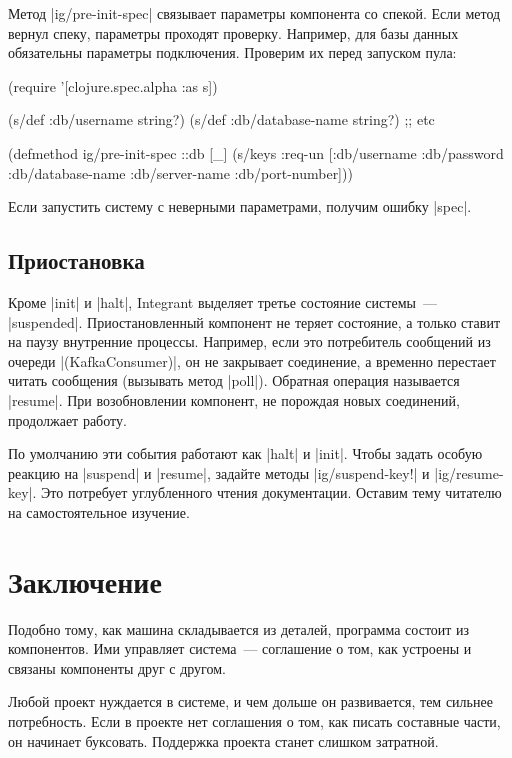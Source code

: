 Метод \spverb|ig/pre-init-spec| связывает параметры компонента со спекой. Если
метод вернул спеку, параметры проходят проверку. Например, для базы данных
обязательны параметры подключения. Проверим их перед запуском пула:

\begin{english}
  \begin{clojure}
(require '[clojure.spec.alpha :as s])

(s/def :db/username string?)
(s/def :db/database-name string?)
;; etc

(defmethod ig/pre-init-spec ::db [_]
  (s/keys :req-un [:db/username
                   :db/password
                   :db/database-name
                   :db/server-name
                   :db/port-number]))
  \end{clojure}
\end{english}

Если запустить систему с неверными параметрами, получим ошибку \spverb|spec|.

\subsection{Приостановка}

Кроме \spverb|init| и \spverb|halt|, Integrant выделяет третье
состояние системы~--- \spverb|suspended|. Приостановленный компонент не теряет
состояние, а только ставит на паузу внутренние процессы. Например, если это
потребитель сообщений из очереди \spverb|(KafkaConsumer)|, он не закрывает
соединение, а временно перестает читать сообщения (вызывать метод
\spverb|poll|). Обратная операция называется \spverb|resume|. При возобновлении
компонент, не порождая новых соединений, продолжает работу.

По умолчанию эти события работают как \spverb|halt| и \spverb|init|. Чтобы
задать особую реакцию на \spverb|suspend| и \spverb|resume|, задайте методы
\spverb|ig/suspend-key!| и \spverb|ig/resume-key|. Это потребует углубленного
чтения документации. Оставим тему читателю на самостоятельное изучение.

\section{Заключение}

Подобно тому, как машина складывается из деталей, программа состоит из
компонентов. Ими управляет система~--- соглашение о том, как устроены и связаны
компоненты друг с другом.

Любой проект нуждается в системе, и чем дольше он развивается, тем сильнее
потребность. Если в проекте нет соглашения о том, как писать составные части, он
начинает буксовать. Поддержка проекта станет слишком затратной.

